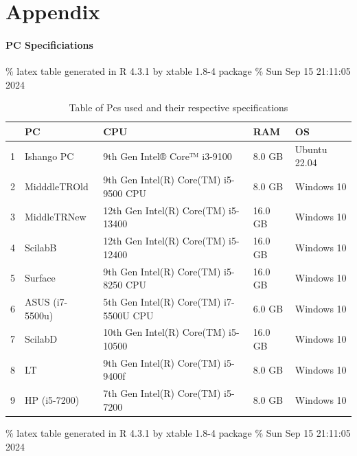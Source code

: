 \documentclass[12pt,halfline,a4paper,]{ouparticle}
\begin{document}
\newpage

\hypertarget{appendix}{%
\section{Appendix}\label{appendix}}

\hypertarget{pc-specificiations}{%
\paragraph{PC Specificiations}\label{pc-specificiations}}

\hfill\break

\% latex table generated in R 4.3.1 by xtable 1.8-4 package \% Sun Sep
15 21:11:05 2024

\begin{table}[ht]
\centering
\begin{tabular}{rllll}
  \hline
 & PC & CPU & RAM & OS \\ 
  \hline
1 & Ishango PC &  9th Gen Intel® Core™ i3-9100  &  8.0 GB  & Ubuntu 22.04 \\ 
  2 & MidddleTROld &  9th Gen Intel(R) Core(TM) i5-9500 CPU  &  8.0 GB  &   Windows 10 \\ 
  3 & MiddleTRNew  &  12th Gen Intel(R) Core(TM) i5-13400  &  16.0 GB  &   Windows 10 \\ 
  4 & ScilabB  &   12th Gen Intel(R) Core(TM) i5-12400  &   16.0 GB   &   Windows 10 \\ 
  5 & Surface  &   9th Gen Intel(R) Core(TM) i5-8250 CPU  &   16.0 GB   &   Windows 10 \\ 
  6 & ASUS (i7-5500u)  &   5th Gen Intel(R) Core(TM) i7-5500U CPU  &   6.0 GB   &   Windows 10 \\ 
  7 & ScilabD  &   10th Gen Intel(R) Core(TM) i5-10500  &   16.0 GB   &   Windows 10 \\ 
  8 & LT  &   9th Gen Intel(R) Core(TM) i5-9400f  &   8.0 GB   &   Windows 10 \\ 
  9 & HP (i5-7200)  &   7th Gen Intel(R) Core(TM) i5-7200  &   8.0 GB   &   Windows 10 \\ 
   \hline
\end{tabular}
\caption{Table of Pcs used and their respective specifications} 
\end{table}

\% latex table generated in R 4.3.1 by xtable 1.8-4 package \% Sun Sep
15 21:11:05 2024
\end{document}
